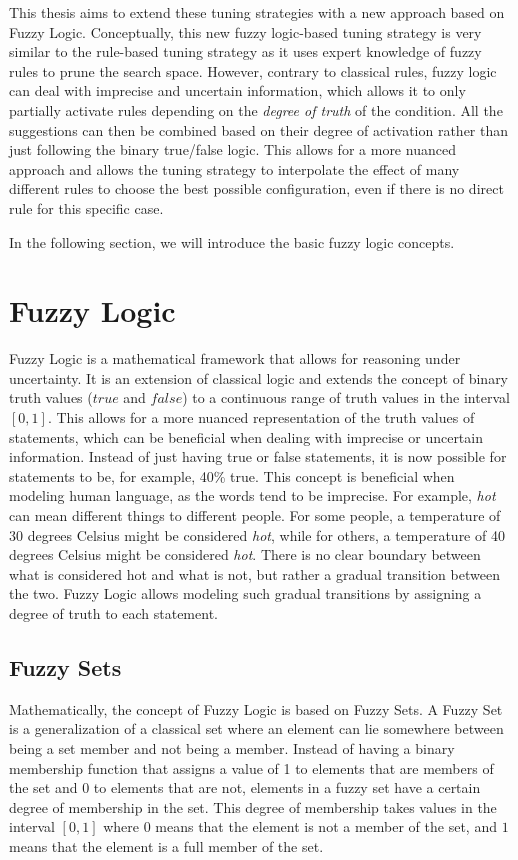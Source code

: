 This thesis aims to extend these tuning strategies with a new approach based on Fuzzy Logic. Conceptually, this new fuzzy logic-based tuning strategy is very similar to the rule-based tuning strategy as it uses expert knowledge of fuzzy rules to prune the search space. However, contrary to classical rules, fuzzy logic can deal with imprecise and uncertain information, which allows it to only partially activate rules depending on the \emph{degree of truth} of the condition.
All the suggestions can then be combined based on their degree of activation rather than just following the binary true/false logic. This allows for a more nuanced approach and allows the tuning strategy to interpolate the effect of many different rules to choose the best possible configuration, even if there is no direct rule for this specific case.

In the following section, we will introduce the basic fuzzy logic concepts.


\section{Fuzzy Logic}

Fuzzy Logic is a mathematical framework that allows for reasoning under uncertainty. It is an extension of classical logic and extends the concept of binary truth values ($true$ and $false$) to a continuous range of truth values in the interval $[0, 1]$. This allows for a more nuanced representation of the truth values of statements, which can be beneficial when dealing with imprecise or uncertain information. Instead of just having true or false statements, it is now possible for statements to be, for example, 40\% true. This concept is beneficial when modeling human language, as the words tend to be imprecise. For example, \emph{hot} can mean different things to different people. For some people, a temperature of 30 degrees Celsius might be considered \emph{hot}, while for others, a temperature of 40 degrees Celsius might be considered \emph{hot}. There is no clear boundary between what is considered hot and what is not, but rather a gradual transition between the two. Fuzzy Logic allows modeling such gradual transitions by assigning a degree of truth to each statement.

\subsection{Fuzzy Sets}

Mathematically, the concept of Fuzzy Logic is based on Fuzzy Sets. A Fuzzy Set is a generalization of a classical set where an element can lie somewhere between being a set member and not being a member. Instead of having a binary membership function that assigns a value of 1 to elements that are members of the set and 0 to elements that are not, elements in a fuzzy set have a certain degree of membership in the set. This degree of membership takes values in the interval $[0, 1]$ where $0$ means that the element is not a member of the set, and $1$ means that the element is a full member of the set.

